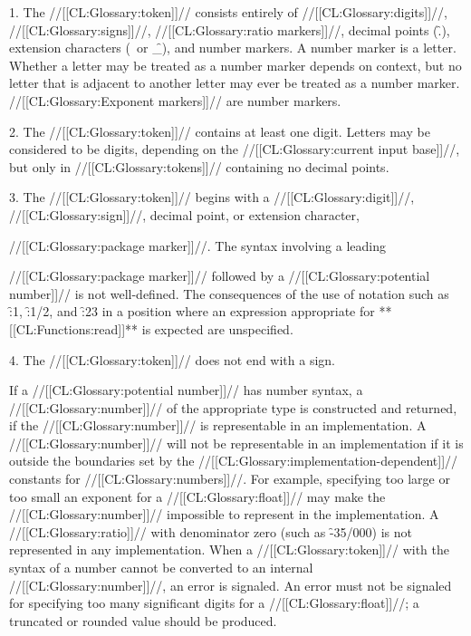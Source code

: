 \beginlist \item{1.} The //[[CL:Glossary:token]]// consists entirely of 
  //[[CL:Glossary:digits]]//,
  //[[CL:Glossary:signs]]//,
  //[[CL:Glossary:ratio markers]]//,
  decimal points (\f{.}),
  extension characters (\hat\ or \f{\_}),
  and number markers. A number marker is a letter.  Whether a letter may be treated as a number marker depends on context, but no letter that is adjacent to another letter may ever be treated as a number marker. //[[CL:Glossary:Exponent markers]]// are number markers.

\item{2.} The //[[CL:Glossary:token]]// contains at least one digit.  Letters may be considered to be digits, depending on the //[[CL:Glossary:current input base]]//, but only in //[[CL:Glossary:tokens]]// containing no decimal points.

\item{3.} The //[[CL:Glossary:token]]// begins with a //[[CL:Glossary:digit]]//, //[[CL:Glossary:sign]]//, decimal point, or extension character,  %

//[[CL:Glossary:package marker]]//. The syntax involving a leading 

//[[CL:Glossary:package marker]]// followed by a //[[CL:Glossary:potential number]]// is not well-defined. The consequences of the use  of notation such as \f{:1}, \f{:1/2}, and \f{:2{\hat}3} in a position where an expression appropriate for **[[CL:Functions:read]]**  is expected are unspecified.

\item{4.} The //[[CL:Glossary:token]]// does not end with a sign. \endlist

If a //[[CL:Glossary:potential number]]// has number syntax,  a //[[CL:Glossary:number]]// of the appropriate type is constructed and returned,  if the //[[CL:Glossary:number]]// is representable in an implementation. A //[[CL:Glossary:number]]// will not be representable in an implementation  if it is outside the boundaries set by the //[[CL:Glossary:implementation-dependent]]//  constants for //[[CL:Glossary:numbers]]//. For example, specifying too large or too small an exponent for a //[[CL:Glossary:float]]// may make the //[[CL:Glossary:number]]// impossible to represent in the implementation. A //[[CL:Glossary:ratio]]// with denominator zero (such as \f{-35/000}) is not represented in any implementation. When a //[[CL:Glossary:token]]// with the syntax of a number cannot be converted to an internal //[[CL:Glossary:number]]//, an error  is signaled.  An error must not be signaled for specifying too many significant digits for a //[[CL:Glossary:float]]//; a truncated or rounded value should be produced.

